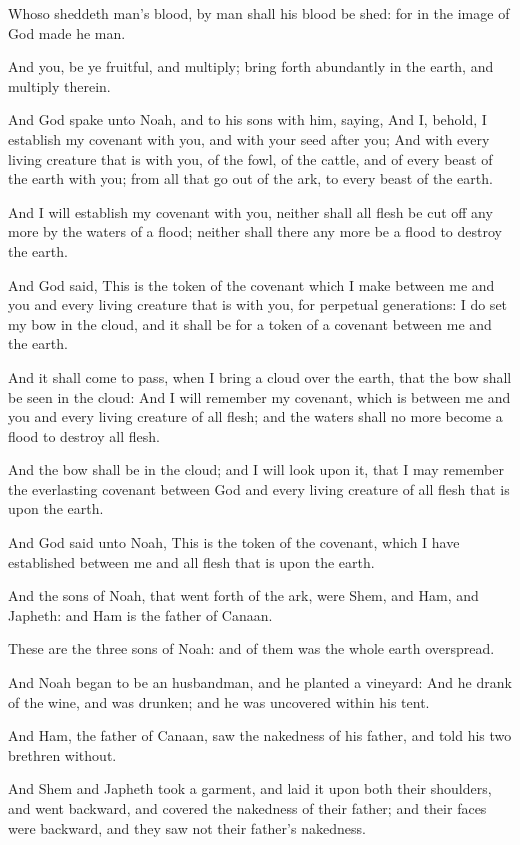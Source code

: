 \verse Whoso sheddeth man's blood, by man shall his blood be shed: for in the image of God made he man.

\verse And you, be ye fruitful, and multiply; bring forth abundantly in the earth, and multiply therein.

\verse And God spake unto Noah, and to his sons with him, saying, \verse And I, behold, I establish my covenant with you, and with your seed after you; \verse And with every living creature that is with you, of the fowl, of the cattle, and of every beast of the earth with you; from all that go out of the ark, to every beast of the earth.

\verse And I will establish my covenant with you, neither shall all flesh be cut off any more by the waters of a flood; neither shall there any more be a flood to destroy the earth.

\verse And God said, This is the token of the covenant which I make between me and you and every living creature that is with you, for perpetual generations: \verse I do set my bow in the cloud, and it shall be for a token of a covenant between me and the earth.

\verse And it shall come to pass, when I bring a cloud over the earth, that the bow shall be seen in the cloud: \verse And I will remember my covenant, which is between me and you and every living creature of all flesh; and the waters shall no more become a flood to destroy all flesh.

\verse And the bow shall be in the cloud; and I will look upon it, that I may remember the everlasting covenant between God and every living creature of all flesh that is upon the earth.

\verse And God said unto Noah, This is the token of the covenant, which I have established between me and all flesh that is upon the earth.

\verse And the sons of Noah, that went forth of the ark, were Shem, and Ham, and Japheth: and Ham is the father of Canaan.

\verse These are the three sons of Noah: and of them was the whole earth overspread.

\verse And Noah began to be an husbandman, and he planted a vineyard: \verse And he drank of the wine, and was drunken; and he was uncovered within his tent.

\verse And Ham, the father of Canaan, saw the nakedness of his father, and told his two brethren without.

\verse And Shem and Japheth took a garment, and laid it upon both their shoulders, and went backward, and covered the nakedness of their father; and their faces were backward, and they saw not their father's nakedness.

